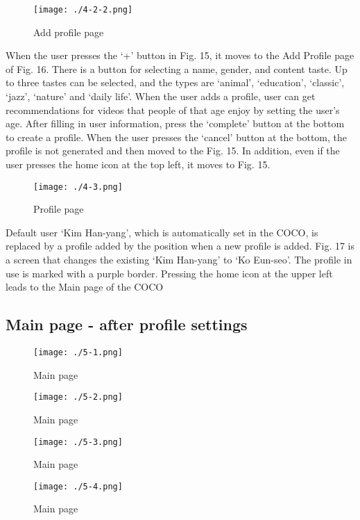\documentclass[conference]{IEEEtran}
\begin{document}
\begin{figure}[H]
\texttt{[image: ./4-2-2.png]}
\centering
\caption{Add profile page}
\end{figure}

When the user presses the ‘+’ button in Fig. 15, it moves to the Add Profile page of Fig. 16. There is a button for selecting a name, gender, and content taste. Up to three tastes can be selected, and the types are ‘animal’, ‘education’, ‘classic’, ‘jazz’, ‘nature’ and ‘daily life’. When the user adds a profile, user can get recommendations for videos that people of that age enjoy by setting the user's age. After filling in user information, press the ‘complete’ button at the bottom to create a profile. When the user presses the ‘cancel’ button at the bottom, the profile is not generated and then moved to the Fig. 15. In addition, even if the user presses the home icon at the top left, it moves to Fig. 15.

\begin{figure}[H]
\texttt{[image: ./4-3.png]}
\centering
\caption{Profile page}
\end{figure}

Default user ‘Kim Han-yang’, which is automatically set in the COCO, is replaced by a profile added by the position when a new profile is added. Fig. 17 is a screen that changes the existing ‘Kim Han-yang’ to ‘Ko Eun-seo’. The profile in use is marked with a purple border. Pressing the home icon at the upper left leads to the Main page of the COCO

\subsection{Main page - after profile settings}
\begin{figure}[H]
\texttt{[image: ./5-1.png]}
\centering
\caption{Main page}
\end{figure}

\begin{figure}[H]
\texttt{[image: ./5-2.png]}
\centering
\caption{Main page}
\end{figure}

\begin{figure}[H]
\texttt{[image: ./5-3.png]}
\centering
\caption{Main page}
\end{figure}

\begin{figure}[H]
\texttt{[image: ./5-4.png]}
\centering
\caption{Main page}
\end{figure}
\end{document}
